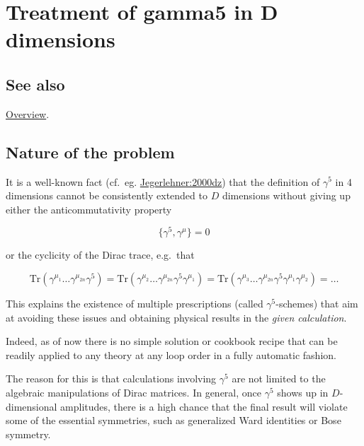 \documentclass[../FeynCalcManual.tex]{subfiles}
\begin{document}
\hypertarget{treatment of gamma5 in d dimensions}{
\section{Treatment of gamma5 in D dimensions}\label{treatment of gamma5 in d dimensions}}

\subsection{See also}

\hyperlink{toc}{Overview}.

\subsection{Nature of the problem}\label{nature-of-the-problem}

It is a well-known fact (cf.~eg.
\href{https://arxiv.org/pdf/hep-th/0005255}{Jegerlehner:2000dz}) that
the definition of \(\gamma^5\) in 4 dimensions cannot be consistently
extended to \(D\) dimensions without giving up either the
anticommutativity property

\begin{equation}
\{\gamma^5, \gamma^\mu\} = 0
\end{equation}

or the cyclicity of the Dirac trace, e.g.~that

\begin{equation}
\mathrm{Tr}( \gamma^{\mu_1} \ldots \gamma^{\mu_{2n}} \gamma^5 ) = \mathrm{Tr}( \gamma^{\mu_2} \ldots \gamma^{\mu_{2n}} \gamma^5 \gamma^{\mu_1} ) = \mathrm{Tr}( \gamma^{\mu_3} \ldots \gamma^{\mu_{2n}} \gamma^5 \gamma^{\mu_1} \gamma^{\mu_2} ) = \ldots
\end{equation}

This explains the existence of multiple prescriptions (called
\(\gamma^5\)-schemes) that aim at avoiding these issues and obtaining
physical results in the \emph{given calculation}.

Indeed, as of now there is no simple solution or cookbook recipe that
can be readily applied to any theory at any loop order in a fully
automatic fashion.

The reason for this is that calculations involving \(\gamma^5\) are not
limited to the algebraic manipulations of Dirac matrices. In general,
once \(\gamma^5\) shows up in \(D\)-dimensional amplitudes, there is a
high chance that the final result will violate some of the essential
symmetries, such as generalized Ward identities or Bose symmetry.
\end{document}
